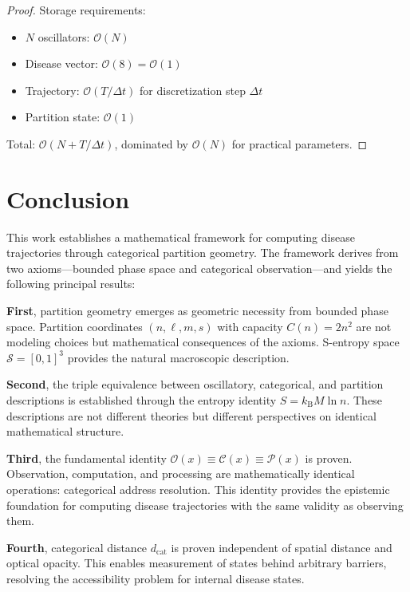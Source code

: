 \documentclass[10pt,twocolumn]{article}
\theoremstyle{plain}
\theoremstyle{definition}
\theoremstyle{remark}
\newcommand{\kB}{k_{\mathrm{B}}}
\newcommand{\Sspace}{\mathcal{S}}
\newcommand{\dcat}{d_{\mathrm{cat}}}
\newcommand{\Obs}{\mathcal{O}}
\newcommand{\Comp}{\mathcal{C}}
\newcommand{\Proc}{\mathcal{P}}
\newcommand{\bigO}{\mathcal{O}}
\begin{document}
\begin{proof}
Storage requirements:
\begin{itemize}
\item $N$ oscillators: $\bigO(N)$
\item Disease vector: $\bigO(8) = \bigO(1)$
\item Trajectory: $\bigO(T/\Delta t)$ for discretization step $\Delta t$
\item Partition state: $\bigO(1)$
\end{itemize}
Total: $\bigO(N + T/\Delta t)$, dominated by $\bigO(N)$ for practical parameters.
\end{proof}

\section{Conclusion}
\label{sec:conclusion}

This work establishes a mathematical framework for computing disease trajectories through categorical partition geometry. The framework derives from two axioms---bounded phase space and categorical observation---and yields the following principal results:

\textbf{First}, partition geometry emerges as geometric necessity from bounded phase space. Partition coordinates $(n, \ell, m, s)$ with capacity $C(n) = 2n^2$ are not modeling choices but mathematical consequences of the axioms. S-entropy space $\Sspace = [0,1]^3$ provides the natural macroscopic description.

\textbf{Second}, the triple equivalence between oscillatory, categorical, and partition descriptions is established through the entropy identity $S = \kB M \ln n$. These descriptions are not different theories but different perspectives on identical mathematical structure.

\textbf{Third}, the fundamental identity $\Obs(x) \equiv \Comp(x) \equiv \Proc(x)$ is proven. Observation, computation, and processing are mathematically identical operations: categorical address resolution. This identity provides the epistemic foundation for computing disease trajectories with the same validity as observing them.

\textbf{Fourth}, categorical distance $\dcat$ is proven independent of spatial distance and optical opacity. This enables measurement of states behind arbitrary barriers, resolving the accessibility problem for internal disease states.
\end{document}
